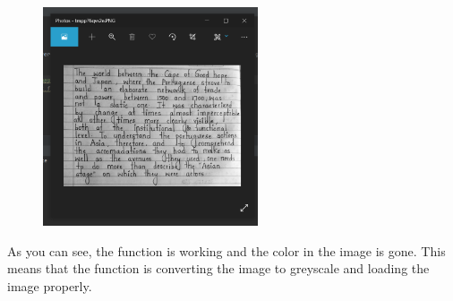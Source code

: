\documentclass{report}
\begin{document}
\begin{figure}[H]
    \centering
    \includegraphics[width = 2.5in]{Images/Development and Testing/Stage 4/Testing for load image from path/Passed Test for Loading from Path.png} 
    \label{fig:Passed Test for Load Image Algorithm}
\end{figure}
\noindent As you can see, the function is working and the color in the image is gone. This means that the function is converting the image to greyscale and loading the image properly.
\end{document}
